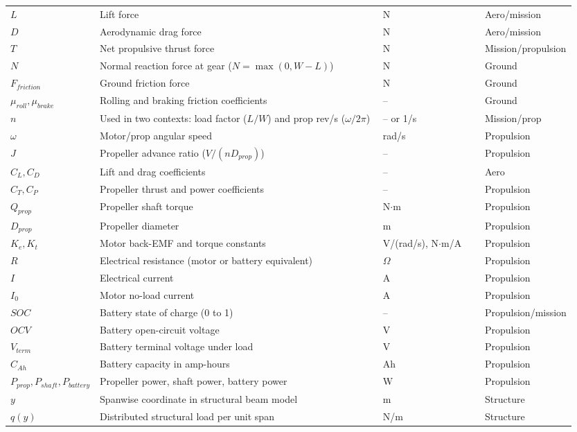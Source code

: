 \begin{longtable}{p{0.15\linewidth} p{0.50\linewidth} p{0.18\linewidth} p{0.12\linewidth}}
\(L\) & Lift force & N & Aero/mission \\
\(D\) & Aerodynamic drag force & N & Aero/mission \\
\(T\) & Net propulsive thrust force & N & Mission/propulsion \\
\(N\) & Normal reaction force at gear (\(N=\max(0,W-L)\)) & N & Ground \\
\(F_{friction}\) & Ground friction force & N & Ground \\
\(\mu_{roll}, \mu_{brake}\) & Rolling and braking friction coefficients & -- & Ground \\
\(n\) & Used in two contexts: load factor (\(L/W\)) and prop rev/s (\(\omega/2\pi\)) & -- or 1/s & Mission/prop \\
\(\omega\) & Motor/prop angular speed & rad/s & Propulsion \\
\(J\) & Propeller advance ratio (\(V/(nD_{prop})\)) & -- & Propulsion \\
\(C_L, C_D\) & Lift and drag coefficients & -- & Aero \\
\(C_T, C_P\) & Propeller thrust and power coefficients & -- & Propulsion \\
\(Q_{prop}\) & Propeller shaft torque & N\(\cdot\)m & Propulsion \\
\(D_{prop}\) & Propeller diameter & m & Propulsion \\
\(K_e, K_t\) & Motor back-EMF and torque constants & V/(rad/s), N\(\cdot\)m/A & Propulsion \\
\(R\) & Electrical resistance (motor or battery equivalent) & \(\Omega\) & Propulsion \\
\(I\) & Electrical current & A & Propulsion \\
\(I_0\) & Motor no-load current & A & Propulsion \\
\(SOC\) & Battery state of charge (0 to 1) & -- & Propulsion/mission \\
\(OCV\) & Battery open-circuit voltage & V & Propulsion \\
\(V_{term}\) & Battery terminal voltage under load & V & Propulsion \\
\(C_{Ah}\) & Battery capacity in amp-hours & Ah & Propulsion \\
\(P_{prop},P_{shaft},P_{battery}\) & Propeller power, shaft power, battery power & W & Propulsion \\
\(y\) & Spanwise coordinate in structural beam model & m & Structure \\
\(q(y)\) & Distributed structural load per unit span & N/m & Structure \\

\end{longtable}
